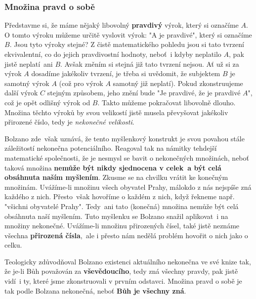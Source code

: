 \subsubsection{Množina pravd o sobě}
Představme si, že máme nějaký libovolný \textbf{pravdivý} výrok, který si označíme $A$. O tomto výroku můžeme určitě vyslovit výrok: "A je pravdivé", který si označíme $B$. Jsou tyto výroky stejné? Z čistě matematického pohledu jsou si tato tvrzení ekvivalentní, co do jejich pravdivostní hodnoty, neboť~i kdyby neplatilo $A$, pak jistě neplatí~ani $B$. Avšak zněním si stejná již tato tvrzení nejsou. Ať už si za výrok $A$ dosadíme jakékoliv tvrzení, je třeba si uvědomit, že subjektem $B$ je samotný výrok $A$ (což pro výrok $A$ samotný již neplatí). Pokud zkonstruujeme další výrok $C$ stejným způsobem, jeho znění bude "Je pravdivé, že je pravdivé $A$", což je opět odlišný výrok od $B$. Takto můžeme pokračovat libovolně dlouho. Množina těchto výroků by svou velikostí jistě musela převyšovat jakékoliv přirozené číslo, tedy je \emph{nekonečné velikosti}.

Bolzano zde~však uznává, že tento myšlenkový konstrukt je svou povahou stále záležitostí nekonečna potenciálního. Reagoval tak na námitky tehdejší matematické společnosti, že je nesmysl se bavit o nekonečných množinách, neboť taková množina \textbf{nemůže být nikdy sjednocena v celek~a být celá obsáhnuta naším myšlením}. Zkusme se na chvilku vrátit ke konečným množinám. Uvážíme-li množinu všech obyvatel Prahy, málokdo z nás nejspíše zná každého z nich. Přesto~však hovoříme o každém z nich, když řekneme např. "všichni obyvatelé Prahy". Tedy~ani tato (konečná) množina nemůže být celá obsáhnuta naší myšlením. Tuto myšlenku se Bolzano snažil aplikovat~i na množiny nekonečné. Uvážíme-li množinu přirozených čísel, také jistě neznáme všechna \textbf{přirozená čísla},~ale i přesto nám nedělá problém hovořit o nich jako o celku.

Teologicky zdůvodňoval Bolzano existenci aktuálního nekonečna ve své knize tak, že je-li Bůh považován za \textbf{vševědoucího}, tedy zná všechny pravdy, pak jistě vidí~i ty, které jsme zkonstruovali v prvním odstavci. Množina pravd o sobě je tak podle Bolzana nekonečná, neboť \textbf{Bůh je všechny zná}.\cite{Bolzano1963}

